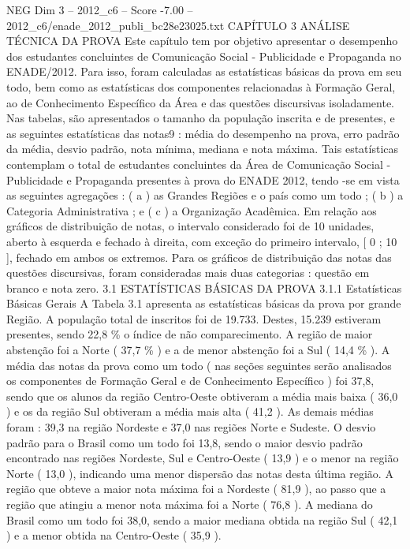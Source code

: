 \begin{textsample}{NEG Dim 3 – 2012\_c6 – Score -7.00 – 2012\_c6/enade\_2012\_publi\_bc28e23025.txt}  \label{ex:f3_neg_020}
CAPÍTULO 3 ANÁLISE TÉCNICA DA PROVA Este capítulo tem por objetivo apresentar o desempenho dos estudantes concluintes de Comunicação Social - Publicidade e Propaganda no ENADE/2012.
Para isso, foram calculadas as estatísticas básicas da prova em seu todo, bem como as estatísticas dos componentes relacionadas à Formação Geral, ao de Conhecimento Específico da Área e das questões discursivas isoladamente.
Nas tabelas, são apresentados o tamanho da população inscrita e de presentes, e as seguintes estatísticas das notas9 : média do desempenho na prova, erro padrão da média, desvio padrão, nota mínima, mediana e nota máxima.
Tais estatísticas contemplam o total de estudantes concluintes da Área de Comunicação Social - Publicidade e Propaganda presentes à prova do ENADE 2012, tendo -se em vista as seguintes agregações : ( a ) as Grandes Regiões e o país como um todo ; ( b ) a Categoria Administrativa ; e ( c ) a Organização Acadêmica.
Em relação aos gráficos de distribuição de notas, o intervalo considerado foi de 10 unidades, aberto à esquerda e fechado à direita, com exceção do primeiro intervalo, [ 0 ; 10 ], fechado em ambos os extremos.
Para os gráficos de distribuição das notas das questões discursivas, foram consideradas mais duas categorias : questão em branco e nota zero. 3.1 ESTATÍSTICAS BÁSICAS DA PROVA 3.1.1 Estatísticas Básicas Gerais A Tabela 3.1 apresenta as estatísticas básicas da prova por grande Região.
A população total de inscritos foi de 19.733.
Destes, 15.239 estiveram presentes, sendo 22,8 \% o índice de não comparecimento.
A região de maior abstenção foi a Norte ( 37,7 \% ) e a de menor abstenção foi a Sul ( 14,4 \% ).
A média das notas da prova como um todo ( nas seções seguintes serão analisados os componentes de Formação Geral e de Conhecimento Específico ) foi 37,8, sendo que os alunos da região Centro-Oeste obtiveram a média mais baixa ( 36,0 ) e os da região Sul obtiveram a média mais alta ( 41,2 ).
As demais médias foram : 39,3 na região Nordeste e 37,0 nas regiões Norte e Sudeste.
O desvio padrão para o Brasil como um todo foi 13,8, sendo o maior desvio padrão encontrado nas regiões Nordeste, Sul e Centro-Oeste ( 13,9 ) e o menor na região Norte ( 13,0 ), indicando uma menor dispersão das notas desta última região.
A região que obteve a maior nota máxima foi a Nordeste ( 81,9 ), ao passo que a região que atingiu a menor nota máxima foi a Norte ( 76,8 ).
A mediana do Brasil como um todo foi 38,0, sendo a maior mediana obtida na região Sul ( 42,1 ) e a menor obtida na Centro-Oeste ( 35,9 ).

\end{textsample}
